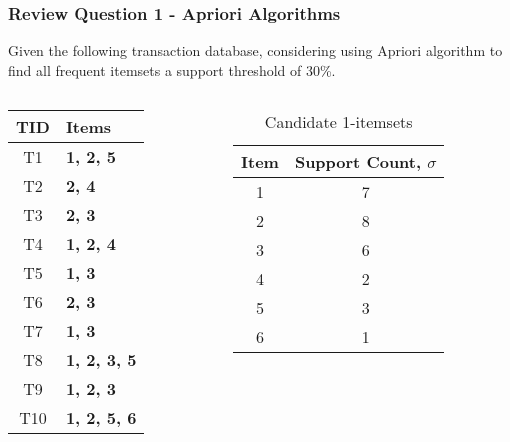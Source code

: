 \documentclass[aspectratio=169, 10pt]{beamer}
\begin{document}
\begin{frame}[t]
\frametitle{Review Question 1 - Apriori Algorithms}
\small

Given the following transaction database, considering using Apriori algorithm to find all frequent itemsets a support threshold of 30\%.

\begin{columns}
    \begin{column}{0.5\textwidth} 
        \begin{table}[]
            \begin{tabular}{c|l}
            TID & \textbf{Items}      \\ \hline
            T1   & \textbf{1, 2, 5}    \\
            T2   & \textbf{2, 4}       \\
            T3   & \textbf{2, 3}       \\
            T4   & \textbf{1, 2, 4}    \\
            T5   & \textbf{1, 3}       \\
            T6   & \textbf{2, 3}       \\
            T7   & \textbf{1, 3}       \\
            T8   & \textbf{1, 2, 3, 5} \\
            T9   & \textbf{1, 2, 3}    \\
            T10  & \textbf{1, 2, 5, 6}
            \end{tabular}
        \end{table}
    \end{column}
    \begin{column}{0.5\textwidth} %

        \begin{table}[]
            \caption{Candidate 1-itemsets}
            \begin{tabular}{c|c}
            Item                     & Support Count, $\sigma$           \\ \hline
            1                        & 7                        \\
            2                        & 8                        \\
            3                        & 6                        \\
            {\color[HTML]{FE0000} 4} & {\color[HTML]{FE0000} 2} \\
            5                        & 3                        \\
            {\color[HTML]{FE0000} 6} & {\color[HTML]{FE0000} 1}
            \end{tabular}
        \end{table}
        

\end{column}
\end{columns}
\end{frame}
\end{document}
